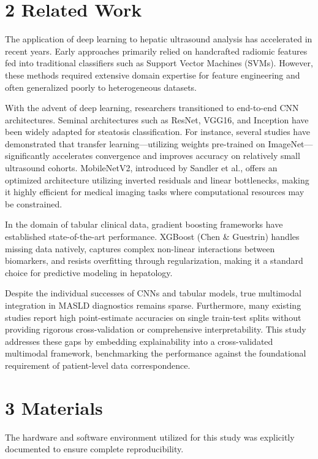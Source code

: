 \section{2 Related Work}\label{related-work}

The application of deep learning to hepatic ultrasound analysis has
accelerated in recent years. Early approaches primarily relied on
handcrafted radiomic features fed into traditional classifiers such as
Support Vector Machines (SVMs). However, these methods required
extensive domain expertise for feature engineering and often generalized
poorly to heterogeneous datasets.

With the advent of deep learning, researchers transitioned to end-to-end
CNN architectures. Seminal architectures such as ResNet, VGG16, and
Inception have been widely adapted for steatosis classification. For
instance, several studies have demonstrated that transfer
learning---utilizing weights pre-trained on ImageNet---significantly
accelerates convergence and improves accuracy on relatively small
ultrasound cohorts. MobileNetV2, introduced by Sandler et al., offers an
optimized architecture utilizing inverted residuals and linear
bottlenecks, making it highly efficient for medical imaging tasks where
computational resources may be constrained.

In the domain of tabular clinical data, gradient boosting frameworks
have established state-of-the-art performance. XGBoost (Chen \&
Guestrin) handles missing data natively, captures complex non-linear
interactions between biomarkers, and resists overfitting through
regularization, making it a standard choice for predictive modeling in
hepatology.

Despite the individual successes of CNNs and tabular models, true
multimodal integration in MASLD diagnostics remains sparse. Furthermore,
many existing studies report high point-estimate accuracies on single
train-test splits without providing rigorous cross-validation or
comprehensive interpretability. This study addresses these gaps by
embedding explainability into a cross-validated multimodal framework,
benchmarking the performance against the foundational requirement of
patient-level data correspondence.

\section{3 Materials}\label{materials}

The hardware and software environment utilized for this study was
explicitly documented to ensure complete reproducibility.

